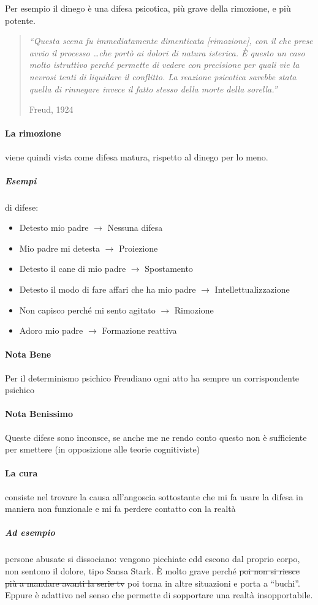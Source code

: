 \documentclass[12pt, a4paper]{article}
\begin{document}
Per esempio il dinego \`e una difesa psicotica, pi\`u grave della rimozione, e pi\`u potente.

\begin{quote}
    \emph{``Questa scena fu immediatamente dimenticata [rimozione], con il che prese avvio il processo \ldots che portò ai dolori di natura isterica. \`E questo un caso molto istruttivo perch\'e permette di vedere con precisione per quali vie la nevrosi tenti di liquidare il conflitto. La reazione psicotica sarebbe stata quella di rinnegare invece il fatto stesso della morte della sorella.''}
    \begin{flushright}
        Freud, 1924
    \end{flushright}
\end{quote}

\paragraph{La rimozione} viene quindi vista come difesa matura, rispetto al dinego per lo meno.

\subparagraph{Esempi} di difese:
\begin{itemize}
    \item Detesto mio padre $\rightarrow$ Nessuna difesa
    \item Mio padre mi detesta $\rightarrow$ Proiezione
    \item Detesto il cane di mio padre $\rightarrow$ Spostamento
    \item Detesto il modo di fare affari che ha mio padre $\rightarrow$ Intellettualizzazione
    \item Non capisco perch\'e mi sento agitato $\rightarrow$ Rimozione
    \item Adoro mio padre $\rightarrow$ Formazione reattiva
\end{itemize}

\paragraph{Nota Bene} Per il determinismo psichico Freudiano ogni atto ha sempre un corrispondente psichico

\paragraph{Nota Benissimo} Queste difese sono inconsce, se anche me ne rendo conto questo non \`e sufficiente per smettere (in opposizione alle teorie cognitiviste)

\paragraph{La cura} consiste nel trovare la causa all'angoscia sottostante che mi fa usare la difesa in maniera non funzionale e mi fa perdere contatto con la realt\`a


\subparagraph{Ad esempio} persone abusate si dissociano: vengono picchiate edd escono dal proprio corpo, non sentono il dolore, tipo Sansa Stark. \`E molto grave perch\'e \st{poi non si riesce pi\`u a mandare avanti la serie tv} poi torna in altre situazioni e porta a ``buchi''. Eppure \`e adattivo nel senso che permette di sopportare una realt\`a insopportabile.
\end{document}
